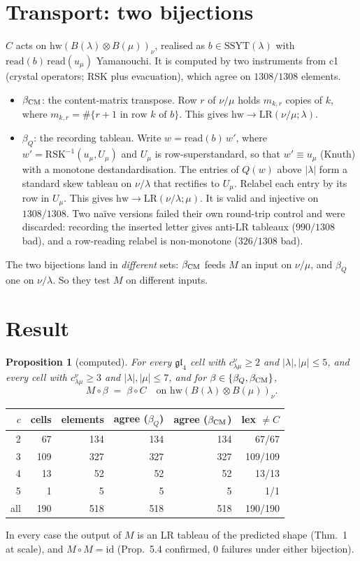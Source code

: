 \documentclass[11pt]{article}
\newtheorem{proposition}[theorem]{Proposition}
\theoremstyle{definition}
\begin{document}
\section{Transport: two bijections}
$C$ acts on $\mathrm{hw}(B(\lambda)\otimes B(\mu))_\nu$, realised as $b\in\mathrm{SSYT}(\lambda)$ with
$\mathrm{read}(b)\,\mathrm{read}(u_\mu)$ Yamanouchi. It is computed by two instruments from c1 (crystal operators;
RSK plus evacuation), which agree on $1308/1308$ elements.
\begin{itemize}
\item $\beta_{\rm CM}$: the content-matrix transpose. Row $r$ of $\nu/\mu$ holds $m_{k,r}$ copies of $k$, where $m_{k,r}=\#\{r{+}1\text{ in row }k\text{ of }b\}$.
This gives $\mathrm{hw}\to\mathrm{LR}(\nu/\mu;\lambda)$.
\item $\beta_Q$: the recording tableau. Write $w=\mathrm{read}(b)\,w'$, where $w'=\mathrm{RSK}^{-1}(u_\mu,U_\mu)$ and $U_\mu$
is row-superstandard, so that $w'\equiv u_\mu$ (Knuth) with a monotone destandardisation. The entries of $Q(w)$ above
$|\lambda|$ form a standard skew tableau on $\nu/\lambda$ that rectifies to $U_\mu$. Relabel each entry by its row in
$U_\mu$. This gives $\mathrm{hw}\to\mathrm{LR}(\nu/\lambda;\mu)$. It is valid and injective on $1308/1308$.
Two na\"ive versions failed their own round-trip control and were discarded: recording the inserted letter gives
anti-LR tableaux ($990/1308$ bad), and a row-reading relabel is non-monotone ($326/1308$ bad).
\end{itemize}
The two bijections land in \emph{different} sets: $\beta_{\rm CM}$ feeds $M$ an input on $\nu/\mu$, and $\beta_Q$ one
on $\nu/\lambda$. So they test $M$ on different inputs.

\section{Result}
\begin{proposition}[computed]\label{prop:main}
For every $\mathfrak{gl}_4$ cell with $c^\nu_{\lambda\mu}\ge2$ and $|\lambda|,|\mu|\le5$, and every cell with
$c^\nu_{\lambda\mu}\ge3$ and $|\lambda|,|\mu|\le7$, and for $\beta\in\{\beta_Q,\beta_{\rm CM}\}$,
\[ M\circ\beta \;=\; \beta\circ C \quad\text{on }\mathrm{hw}(B(\lambda)\otimes B(\mu))_\nu. \]
\end{proposition}
\begin{center}\begin{tabular}{rrrrrr}\toprule
$c$ & cells & elements & agree ($\beta_Q$) & agree ($\beta_{\rm CM}$) & lex $\ne C$ \\ \midrule
2 & 67 & 134 & 134 & 134 & 67/67\\
3 & 109 & 327 & 327 & 327 & 109/109\\
4 & 13 & 52 & 52 & 52 & 13/13\\
5 & 1 & 5 & 5 & 5 & 1/1\\ \midrule
all & 190 & 518 & 518 & 518 & 190/190\\ \bottomrule
\end{tabular}\end{center}
In every case the output of $M$ is an LR tableau of the predicted shape (Thm.~1 at scale), and $M\circ M=\mathrm{id}$
(Prop.~5.4 confirmed, $0$ failures under either bijection).
\end{document}

